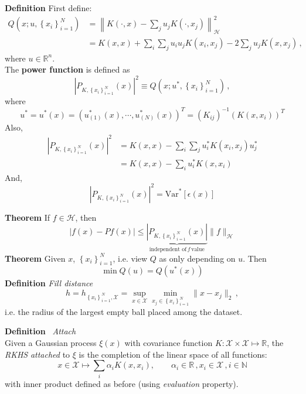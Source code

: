 \documentclass[a4paper,onecolumn]{article}
\begin{document}
\noindent \textbf{Definition} First define:
\begin{equation*}\begin{split}
    Q(x; u, \left\{x_i\right\}_{i=1}^N) &= \left\| K(\cdot, x) - \sum_j u_j K(\cdot, x_j) \right\|^2_{\mathcal{H}}\\
    &= K(x,x) + \sum_i \sum_j u_i u_j K(x_i, x_j)
    - 2 \sum_{j} u_j K(x, x_j)\,,
\end{split}\end{equation*}
where $u\in \mathbb{R}^n$.\\
The \textbf{power function} is defined as
$$
    \left|P_{K, \left\{x_i\right\}_{i=1}^N} (x)\right|^2 \equiv Q(x; u^*, \left\{x_i\right\}_{i=1}^N)\,,
$$
where 
$$
    u^* =u^*(x) = \left(u^*_{(1)}(x),\cdots, u^*_{(N)}(x)\right)^T = (K_{ij})^{-1} \left(K(x, x_i)\right)^T
$$
Also,
\begin{equation*}\begin{split}
    \left|P_{K, \left\{x_i\right\}_{i=1}^N} (x)\right|^2 &= K(x,x) - \sum_{i}\sum_j u_i^* K(x_i, x_j) u_j^*\\
    &= K(x,x) - \sum_i u_i^* K(x, x_i)
\end{split}\end{equation*}
And,
$$
    \left|P_{K, \left\{x_i\right\}_{i=1}^N} (x)\right|^2 = \textrm{Var}^*\left[\epsilon (x)\right]
$$

\noindent \textbf{Theorem} If $f\in \mathcal{H}$, then
$$
    \left|f(x) - Pf(x)\right| \le \underbrace{\left| P_{K, \left\{x_i\right\}_{i=1}^N} (x)\right|}_{\textrm{independent of} \, f\, \textrm{value}} \|f\|_{\mathcal{H}}
$$
\textbf{Theorem} Given $x$, $\left\{x_i\right\}_{i=1}^N$, i.e. view $Q$ as only depending on $u$. Then
$$
    \min Q(u) = Q(u^*(x))
$$
\textbf{Definition} \emph{Fill distance} 
$$
    h = h_{\left\{x_i\right\}_{i=1}^N, \mathcal{X}} = \sup_{x\in \mathcal{X}} \min_{x_j \in \left\{x_i\right\}_{i=1}^N} \| x-x_j \|_2\,,
$$
i.e. the radius of the largest empty ball placed among the dataset.

\noindent \textbf{Definition} $\,$ \emph{Attach}\\
\noindent Given a Gaussian process $\xi(x)$ 
with covariance function $K: \mathcal{X}\times \mathcal{X} \mapsto \mathbb{R}$,
the \emph{RKHS} \emph{attached} to $\xi$ is the completion of the linear space of all functions:
$$
    x\in\mathcal{X} \mapsto \sum_i \alpha_i K(x, x_i),\qquad \alpha_i \in \mathbb{R}\,,x_i \in \mathcal{X}\,, i\in \mathbb{N}
$$
with inner product defined as before (using \emph{evaluation} property).
\end{document}
